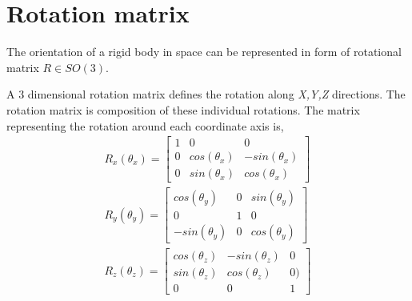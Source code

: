 \section{Rotation matrix}
\label{sec:rot_mat}
The orientation of a rigid body in space can be represented in form of rotational matrix $R \in SO(3)$.

A 3 dimensional rotation matrix defines the rotation along \emph{X,Y,Z} directions. The rotation matrix is composition of these individual rotations. The matrix representing the rotation around each coordinate axis is,
\begin{equation}
	\begin{split}
	R_x(\theta_x) = 
	\begin{bmatrix}
	1 &0 &0 \\ 0 &cos(\theta_x) &-sin(\theta_x)\\ 0 &sin(\theta_x) &cos(\theta_x)
	\end{bmatrix}\\
	R_y(\theta_y) = 
	\begin{bmatrix}
	cos(\theta_y) &0 &sin(\theta_y) \\ 0 &1 &0\\ -sin(\theta_y) &0 &cos(\theta_y)
	\end{bmatrix}\\
	R_z(\theta_z) = 
	\begin{bmatrix}
	cos(\theta_z) &-sin(\theta_z) &0 \\ sin(\theta_z) &cos(\theta_z) &0)\\ 0 &0 &1
	\end{bmatrix}
	\end{split}
\end{equation}
